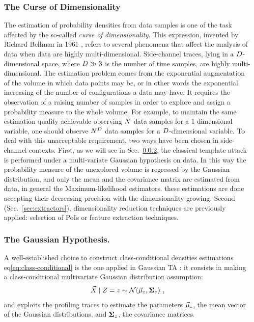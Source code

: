 \subsubsection{The Curse of Dimensionality}
The estimation of probability densities from data samples is one of the task affected by the so-called \emph{curse of dimensionality}. This expression, invented by Richard Bellman in 1961 \cite{bellman2015adaptive}, refers to several phenomena that affect the analysis of data when data are highly multi-dimensional. Side-channel traces, lying in a $D$-dimensional space, where $D\gg 3$ is the number of time samples, are highly multi-dimensional. The estimation problem comes from the exponential augmentation of the volume in which data points may be, or in other words the exponential increasing of the number of configurations a data may have. It requires the observation of a raising number of samples in order to explore and assign a probability measure to the whole volume. For example, to maintain the same estimation quality achievable observing $N$ data samples for a 1-dimensional variable, one should observe $N^D$ data samples for a $D$-dimensional variable. To deal with this unacceptable requirement, two ways have been chosen in side-channel contexts. First, as we will see in Sec.~\ref{sec:gauss_hp}, the classical template attack is performed under a multi-variate Gaussian hypothesis on data. In this way the probability measure of the unexplored volume is regressed by the Gaussian distribution, and only the mean and the covariance matrix are estimated from data, in general \via the  Maximum-likelihood estimators. these estimations are done accepting their decreasing precision with the dimensionality growing. Second (Sec.~\ref{sec:extractors}), dimensionality reduction techniques are previously applied: selection of PoIs or feature extraction techniques. 

\subsubsection{The Gaussian Hypothesis.}\label{sec:gauss_hp} A well-established choice to construct class-conditional densities estimations eq\ref{eq:class-conditional} is the one applied in Gaussian TA \cite{Chari2003}: it consists in making a class-conditional multivariate Gaussian distribution assumption:
\begin{equation}\label{eq:gaussian_assumption}
\given{\vaLeakVec}{\sensRandVar} =\sensVar \sim \mathcal{N}(\mumumu_\sensVar, \boldsymbol{\Sigma}_\sensVar)\mbox{ ,}
\end{equation} 
and exploits the profiling traces to estimate the  parameters $\vec{\mu}_z$, \ie the mean vector of the Gaussian distributions, and $ \boldsymbol{\Sigma}_z$, \ie the covariance matrices. \\

